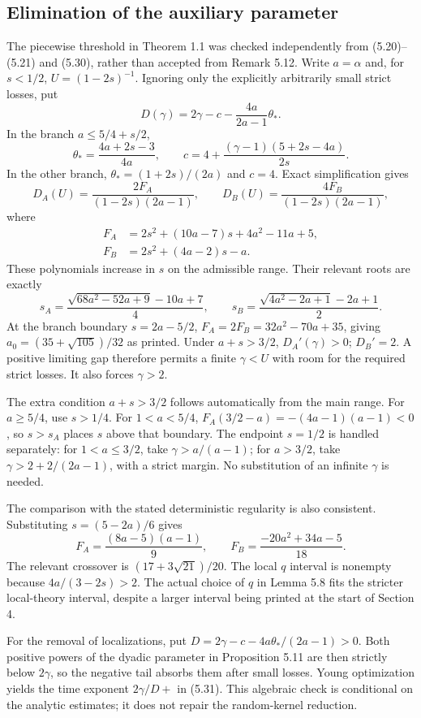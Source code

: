 \documentclass[10pt]{article}
\begin{document}
\subsection*{Elimination of the auxiliary parameter}
The piecewise threshold in Theorem 1.1 was checked independently from (5.20)–(5.21) and (5.30), rather than accepted from Remark 5.12. Write \(a=\alpha\) and, for \(s<1/2\), \(U=(1-2s)^{-1}\). Ignoring only the explicitly arbitrarily small strict losses, put \[D(\gamma)=2\gamma-c-\frac{4a}{2a-1}\theta_*.\] In the branch \(a\le5/4+s/2\), \[\theta_*=\frac{4a+2s-3}{4a},\qquad
 c=4+\frac{(\gamma-1)(5+2s-4a)}{2s}.\] In the other branch, \(\theta_*=(1+2s)/(2a)\) and \(c=4\). Exact simplification gives \[D_A(U)=\frac{2F_A}{(1-2s)(2a-1)},\qquad
 D_B(U)=\frac{4F_B}{(1-2s)(2a-1)},\] where \[\begin{split}
 F_A&=2s^2+(10a-7)s+4a^2-11a+5,\\
 F_B&=2s^2+(4a-2)s-a.
 \end{split}\] These polynomials increase in \(s\) on the admissible range. Their relevant roots are exactly \[s_A=\frac{\sqrt{68a^2-52a+9}-10a+7}{4},\qquad
 s_B=\frac{\sqrt{4a^2-2a+1}-2a+1}{2}.\] At the branch boundary \(s=2a-5/2\), \(F_A=2F_B=32a^2-70a+35\), giving \(a_0=(35+\sqrt{105})/32\) as printed. Under \(a+s>3/2\), \(D_A'(\gamma)>0\); \(D_B'=2\). A positive limiting gap therefore permits a finite \(\gamma<U\) with room for the required strict losses. It also forces \(\gamma>2\).\par
The extra condition \(a+s>3/2\) follows automatically from the main range. For \(a\ge5/4\), use \(s>1/4\). For \(1<a<5/4\), \(F_A(3/2-a)=-(4a-1)(a-1)<0\), so \(s>s_A\) places \(s\) above that boundary. The endpoint \(s=1/2\) is handled separately: for \(1<a\le3/2\), take \(\gamma>a/(a-1)\); for \(a>3/2\), take \(\gamma>2+2/(2a-1)\), with a strict margin. No substitution of an infinite \(\gamma\) is needed.\par
The comparison with the stated deterministic regularity is also consistent. Substituting \(s=(5-2a)/6\) gives \[F_A=\frac{(8a-5)(a-1)}9,\qquad
 F_B=\frac{-20a^2+34a-5}{18}.\] The relevant crossover is \((17+3\sqrt{21})/20\). The local \(q\) interval is nonempty because \(4a/(3-2s)>2\). The actual choice of \(q\) in Lemma 5.8 fits the stricter local-theory interval, despite a larger interval being printed at the start of Section 4.\par
For the removal of localizations, put \(D=2\gamma-c-4a\theta_* /(2a-1)>0\). Both positive powers of the dyadic parameter in Proposition 5.11 are then strictly below \(2\gamma\), so the negative tail absorbs them after small losses. Young optimization yields the time exponent \(2\gamma/D+\) in (5.31). This algebraic check is conditional on the analytic estimates; it does not repair the random-kernel reduction.\par
\end{document}
